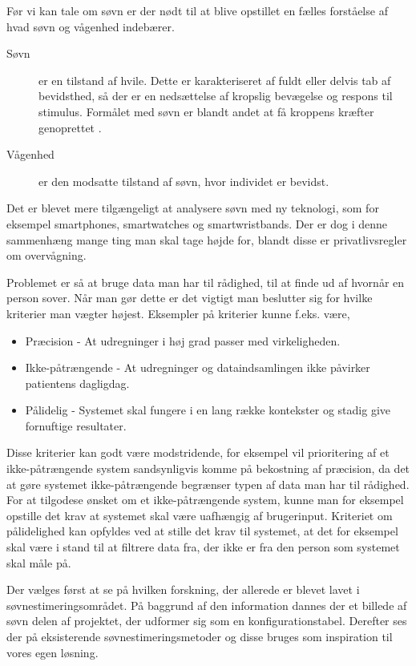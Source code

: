Før vi kan tale om søvn er der nødt til at blive opstillet en fælles forståelse af hvad søvn og vågenhed indebærer.
\begin{description}
		\item[Søvn] er en tilstand af hvile. Dette er karakteriseret af fuldt eller delvis tab af bevidsthed, så der er en nedsættelse af kropslig bevægelse og respons til stimulus. Formålet med søvn er blandt andet at få kroppens kræfter genoprettet \citep{misc:SleepDefinition}.
		\item[Vågenhed] er den modsatte tilstand af søvn, hvor individet er bevidst.
\end{description}

Det er blevet mere tilgængeligt at analysere søvn med ny teknologi, som for eksempel smartphones, smartwatches og smartwristbands.
Der er dog i denne sammenhæng mange ting man skal tage højde for, blandt disse er privatlivsregler om overvågning.

Problemet er så at bruge data man har til rådighed, til at finde ud af hvornår en person sover.
Når man gør dette er det vigtigt man beslutter sig for hvilke kriterier man vægter højest.
Eksempler på kriterier kunne f.eks. være,

\begin{itemize}
	\item Præcision - At udregninger i høj grad passer med virkeligheden.
	\item Ikke-påtrængende - At udregninger og dataindsamlingen ikke påvirker patientens dagligdag.
	\item Pålidelig - Systemet skal fungere i en lang række kontekster og stadig give fornuftige resultater.
\end{itemize}

Disse kriterier kan godt være modstridende, for eksempel vil prioritering af et ikke-påtrængende system sandsynligvis komme på bekostning af præcision, da det at gøre systemet ikke-påtrængende begrænser typen af data man har til rådighed.
For at tilgodese ønsket om et ikke-påtrængende system, kunne man for eksempel opstille det krav at systemet skal være uafhængig af brugerinput.
Kriteriet om pålidelighed kan opfyldes ved at stille det krav til systemet, at det for eksempel skal være i stand til at filtrere data fra, der ikke er fra den person som systemet skal måle på.

Der vælges først at se på hvilken forskning, der allerede er blevet lavet i søvn\-es\-ti\-me\-rings\-om\-rå\-det.
På baggrund af den information dannes der et billede af søvn delen af projektet, der udformer sig som en konfigurationstabel.
Derefter ses der på eksisterende søvnestimeringsmetoder og disse bruges som inspiration til vores egen løsning.